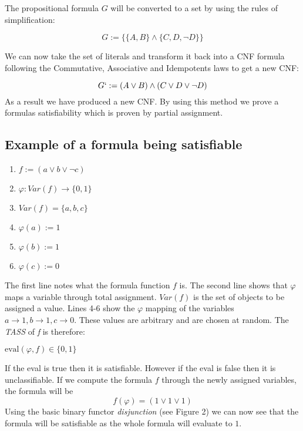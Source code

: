 \documentclass[11pt,a4paper]{article}
\begin{document}
The propositional formula $G$ will be converted to a set by using the rules of simplification:

\begin{displaymath}
 G := \{\{{{A,B}\} \land \{{C,D,\neg D}}\}\}
\end{displaymath}

We can now take the set of literals and transform it back into a CNF formula following the Commutative, Associative and Idempotents laws to get a new CNF:

\begin{displaymath}
G`:= (A \lor B) \land (C \lor D \lor \neg D)
\end{displaymath}
As a result we have produced a new CNF. By using this method we prove a formulas satisfiability which is proven by partial assignment. 


\subsection{Example of a formula being satisfiable}

\begin{enumerate}
\item $f:= (a \lor b \lor \neg c)$
\item $\varphi: Var (f) \rightarrow \{0,1\}$
\item $Var (f) = \{a,b,c\}$
\item $\varphi(a):= 1$
\item $\varphi(b):= 1$
\item $\varphi(c):= 0$
\end{enumerate}

The first line notes what the formula function $f$ is. The second line shows that $\varphi$ maps a variable through total assignment. $Var(f)$ is the set of objects to be assigned a value. Lines 4-6 show the $\varphi$ mapping of the variables $a \rightarrow 1, b \rightarrow 1, c \rightarrow 0$. These values are arbitrary and are chosen at random. 
The \textit{TASS} of \textit{f} is therefore: 

\begin{center}
$\text{eval} (\varphi, f) \in \{0,1\}$
\end{center}
If the eval is true then it is satisfiable. However if the eval is false then it is unclassifiable. 
If we compute the formula $f$ through the newly assigned variables, the formula will be
\begin{displaymath}
f(\varphi) = (1 \lor 1 \lor 1)
\end{displaymath}
Using the basic binary functor \emph{disjunction} (see Figure 2) we can now see that the formula will be satisfiable as the whole formula will evaluate to $1$. 
\end{document}
